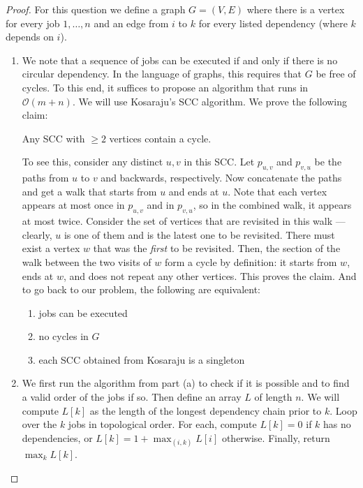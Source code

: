   \begin{proof}
    For this question we define a graph $G = (V, E)$ where there is a vertex for every job $1, \dots, n$ and an edge from $i$ to $k$ for every listed dependency (where $k$ depends on $i$).

    \begin{enumerate}
        \item We note that a sequence of jobs can be executed if and only if there is no circular dependency. In the language of graphs, this requires that $G$ be free of cycles. To this end, it suffices to propose an algorithm that runs in $\mathcal{O}(m+n)$. We will use Kosaraju's SCC algorithm. We prove the following claim:

        \centerline{Any SCC with $\geqslant 2$ vertices contain a cycle.}
                    \vspace{5pt} 
  
        To see this, consider any distinct $u,v$ in this SCC. Let $p_{u,v}$ and $p_{v,u}$ be the paths from $u$ to $v$ and backwards, respectively. Now concatenate the paths and get a walk that starts from $u$ and ends at $u$. Note that each vertex appears at most once in $p_{u,v}$ and in $p_{v,u}$, so in the combined walk, it appears at most twice. Consider the set of vertices that are revisited in this walk --- clearly, $u$ is one of them and is the latest one to be revisited. There must exist a vertex $w$ that was the \textit{first} to be revisited. Then, the section of the walk between the two visits of $w$ form a cycle by definition: it starts from $w$, ends at $w$, and does not repeat any other vertices. This proves the claim. And to go back to our problem, the following are equivalent: 
        \begin{enumerate}
          \item jobs can be executed 
          \item no cycles in $G$ 
          \item each SCC obtained from Kosaraju is a singleton
        \end{enumerate}

        \item We first run the algorithm from part (a) to check if it is possible and to find a valid order of the jobs if so. Then define an array $L$ of length $n$. We will compute $L[k]$ as the length of the longest dependency chain prior to $k$. Loop over the $k$ jobs in topological order. For each, compute $L[k] = 0$ if $k$ has no dependencies, or $L[k] = 1 + \max_{(i, k)} L[i]$ otherwise. Finally, return $\max_{k} L[k]$. 
    \end{enumerate}
    
  \end{proof}

